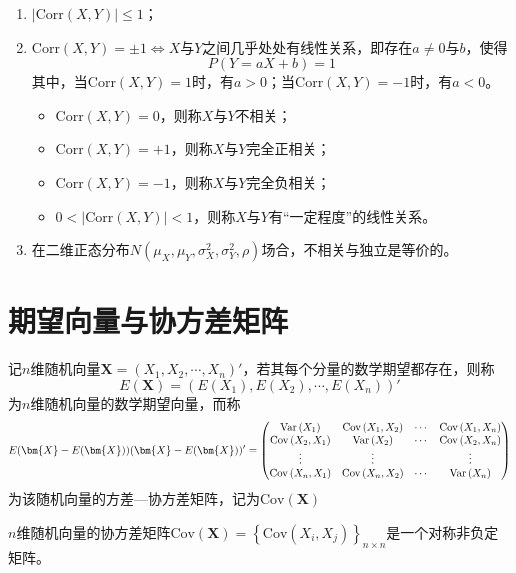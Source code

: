 \begin{property}
\begin{enumerate}
   \item $\left | \text{Corr}(X,Y) \right | \le1$；
    
    \item $\text{Corr}(X,Y)=\pm1\Leftrightarrow X$与$Y$之间几乎处处有线性关系，即存在$a \neq0$与$b$，使得$$P(Y=aX+b)=1$$其中，当$\text{Corr}(X,Y)=1$时，有$a>0$；当$\text{Corr}(X,Y)=-1$时，有$a<0$。
    
    \begin{remark}
    \begin{itemize}
        \item $\text{Corr}(X,Y)=0$，则称$X$与$Y$不相关；
        \item $\text{Corr}(X,Y)=+1$，则称$X$与$Y$完全正相关；
        \item $\text{Corr}(X,Y)=-1$，则称$X$与$Y$完全负相关；
        \item $0<\left | \text{Corr}(X,Y) \right | <1$，则称$X$与$Y$有“一定程度”的线性关系。
\end{itemize}
    \end{remark}
    \item 在二维正态分布$N\left(\mu_{X}, \mu_{Y}, \sigma_{X}^{2}, \sigma_{Y}^{2}, \rho\right)$场合，不相关与独立是等价的。
\end{enumerate}
\end{property}
\section{期望向量与协方差矩阵}
\begin{definition}
记$n$维随机向量$\bm{X}=\left(X_{1}, X_{2}, \cdots, X_{n}\right)'$，若其每个分量的数学期望都存在，则称$$E(\bm{X})=\left(E\left(X_{1}\right), E\left(X_{2}\right), \cdots, E\left(X_{n}\right)\right)'$$为$n$维随机向量的数学期望向量，而称$$
E(\bm{X}-E(\bm{X}))(\bm{X}-E(\bm{X}))'\\
=\left(\begin{matrix}
\text{Var}\left(X_{1}\right) & \text{Cov}\left(X_{1}, X_{2}\right) & \cdots & \text{Cov}\left(X_{1}, X_{n}\right) \\
\text{Cov}\left(X_{2}, X_{1}\right) & \text{Var}\left(X_{2}\right) & \cdots & \text{Cov}\left(X_{2}, X_{n}\right) \\
\vdots & \vdots & & \vdots \\
\text{Cov}\left(X_{n}, X_{1}\right) & \text{Cov}\left(X_{n}, X_{2}\right) & \cdots & \text{Var}\left(X_{n}\right)
\end{matrix}\right)
$$为该随机向量的方差—协方差矩阵，记为$\text{Cov}(\bm{X})$
\end{definition}
\begin{theorem}
$n$维随机向量的协方差矩阵$\text{Cov}(\bm{X})=\left\{\text{Cov}\left(X_{i}, X_{j}\right)\right\}_{n\times n}$是一个对称非负定矩阵。
\end{theorem}
